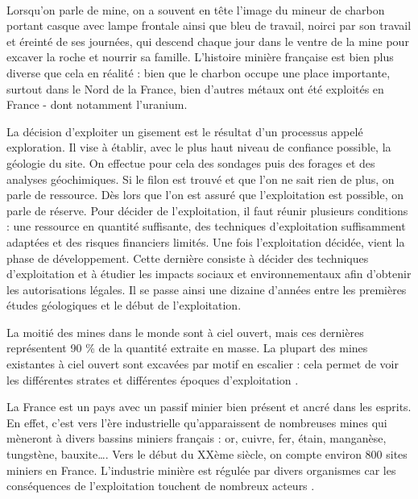 \documentclass{article}
\begin{document}
\paragraph{} Lorsqu’on parle de mine, on a souvent en tête l’image du mineur de charbon portant casque avec lampe frontale ainsi que bleu de travail, noirci par son travail et éreinté de ses journées, qui descend chaque jour dans le ventre de la mine pour excaver la roche et nourrir sa famille. L’histoire minière française est bien plus diverse que cela en réalité : bien que le charbon occupe une place importante, surtout dans le Nord de la France, bien d’autres métaux ont été exploités en France - dont notamment l’uranium.

La décision d’exploiter un gisement est le résultat d’un processus appelé exploration. Il vise à établir, avec le plus haut niveau de confiance possible, la géologie du site. On effectue pour cela des sondages puis des forages et des analyses géochimiques. Si le filon est trouvé et que l’on ne sait rien de plus, on parle de ressource. Dès lors que l’on est assuré que l’exploitation est possible, on parle de réserve. Pour décider de l’exploitation, il faut réunir plusieurs conditions : une ressource en quantité suffisante, des techniques d’exploitation suffisamment adaptées et des risques financiers limités. Une fois l’exploitation décidée, vient la phase de développement. Cette dernière consiste à décider des techniques d’exploitation et à étudier les impacts sociaux et environnementaux afin d’obtenir les autorisations légales. Il se passe ainsi une dizaine d’années entre les premières études géologiques et le début de l’exploitation. 

La moitié des mines dans le monde sont à ciel ouvert, mais ces dernières représentent 90 \% de la quantité extraite en masse. La plupart des mines existantes à ciel ouvert sont excavées par motif en escalier : cela permet de voir les différentes strates et différentes époques d’exploitation \cite{raimbault_mine_2020}.

La France est un pays avec un passif minier bien présent et ancré dans les esprits. En effet, c’est vers l’ère industrielle qu’apparaissent de nombreuses mines qui mèneront à divers bassins miniers français : or, cuivre, fer, étain, manganèse, tungstène, bauxite…. Vers le début du XXème siècle, on compte environ 800 sites miniers en France. L’industrie minière est régulée par divers organismes car les conséquences de l’exploitation touchent de nombreux acteurs \cite{ledoux_notions_2020}.
\end{document}
